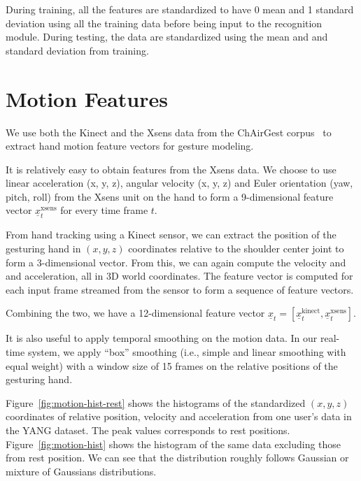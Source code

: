 During training, all the features are standardized to have 0 mean and 1 standard
deviation using all the training data before being input to the recognition
module. During testing, the data are standardized using the mean and and
standard deviation from training.

\section{Motion Features}
We use both the Kinect and the Xsens data from the ChAirGest corpus~\cite{Ruffieux2013} to
extract hand motion feature vectors for gesture modeling.

It is relatively easy to obtain features from the Xsens data. We choose to use linear
acceleration (x, y, z), angular velocity (x, y, z) and Euler orientation (yaw, pitch, roll)
from the Xsens unit on the hand to form a 9-dimensional feature vector $\underline{x}_t^{\text{xsens}}$
for every time frame $t$.

From hand tracking using a Kinect sensor, we can extract the position of the
gesturing hand in $(x, y, z)$ coordinates relative to the shoulder center joint to
form a 3-dimensional vector. From this, we can again compute  the 
velocity and and acceleration, all in 3D world coordinates. The feature vector
is computed for each input frame streamed from the sensor to form a sequence of
feature vectors.

Combining the two, we
have a 12-dimensional feature vector $\underline{x}_t = [\underline{x}^\text{kinect}_t, \underline{x}^\text{xsens}_t]$.

It is also useful to apply temporal smoothing on the motion data. In our
real-time system, we apply ``box'' smoothing (i.e., simple and linear smoothing
with equal weight) with a window size of 15 frames on the relative positions of
the gesturing hand.

Figure~\ref{fig:motion-hist-rest} shows the histograms of the standardized $(x,
y, z)$ coordinates of relative position, velocity and acceleration from one user's
data in the YANG dataset. The peak values corresponds to rest positions.
Figure~\ref{fig:motion-hist} shows the histogram of the same data excluding
those from rest position. We can see that the distribution roughly follows
Gaussian or mixture of Gaussians distributions.

